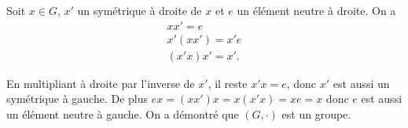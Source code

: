 Soit $x\in G$, $x'$ un symétrique à droite de $x$ et $e$ un  élément neutre à
droite. On a
\begin{gather*}
  xx' = e \\
  x'(xx') = x'e \\
  (x'x)x' = x'.
\end{gather*}

En multipliant à droite par l'inverse de $x'$, il reste $x'x = e$, donc $x'$
est aussi un symétrique à gauche. De plus $ex = (xx')x = x(x'x) = xe = x$ donc
$e$ est aussi un élément neutre à gauche. On a démontré que $(G,\cdot)$ est un
groupe.

